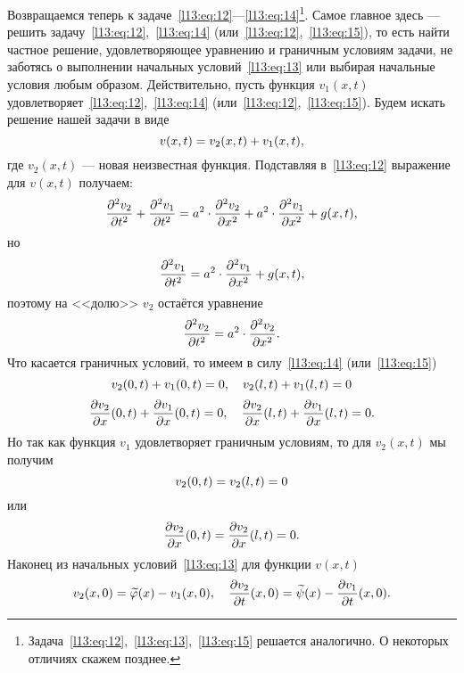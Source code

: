 Возвращаемся теперь к задаче~\eqref{l13:eq:12}---\eqref{l13:eq:14}\footnote{Задача~\eqref{l13:eq:12},~\eqref{l13:eq:13},~\eqref{l13:eq:15} решается аналогично. О некоторых отличиях скажем позднее.}. Самое главное здесь --- решить задачу~\eqref{l13:eq:12},~\eqref{l13:eq:14} (или~\eqref{l13:eq:12},~\eqref{l13:eq:15}), то есть найти частное решение, удовлетворяющее уравнению и граничным условиям задачи, не заботясь о выполнении начальных условий~\eqref{l13:eq:13} или выбирая начальные условия любым образом. Действительно, пусть функция $v_1(x,t)$ удовлетворяет~\eqref{l13:eq:12},~\eqref{l13:eq:14} (или~\eqref{l13:eq:12},~\eqref{l13:eq:15}). Будем искать решение нашей задачи в виде
\begin{equation*}
	\hfill v(x,t)=v_{2}(x,t)+v_1(x,t),\hfill
\end{equation*}
где $v_2(x,t)$ --- новая неизвестная функция. Подставляя в~\eqref{l13:eq:12} выражение для $v(x,t)$ получаем:
\begin{equation*}
	\hfill\pdder{v_2}{t}+\pdder{v_1}{t}=a^2\cdot\pdder{v_2}{x}+a^2\cdot\pdder{v_1}{x}+g(x,t),\hfill
\end{equation*}
но
\begin{equation*}
	\hfill\pdder{v_1}{t}=a^2\cdot\pdder{v_1}{x}+g(x,t),\hfill
\end{equation*}
поэтому на <<долю>> $v_2$ остаётся уравнение
\begin{equation}\label{l13:eq:16}
	\hfill\pdder{v_2}{t}=a^2\cdot\pdder{v_2}{x}.\hfill
\end{equation}
Что касается граничных условий, то имеем в силу~\eqref{l13:eq:14} (или~\eqref{l13:eq:15})
\begin{equation*}
	\hfill v_2(0,t)+v_1(0,t)=0,\quad v_2(l,t)+v_1(l,t)=0\hfill
\end{equation*} 
\begin{equation*}
	\hfill \pder{v_2}{x}(0,t)+\pder{v_1}{x}(0,t)=0,\quad \pder{v_2}{x}(l,t)+\pder{v_1}{x}(l,t)=0.\hfill
\end{equation*} 
Но так как функция $v_1$ удовлетворяет граничным условиям, то для $v_2(x,t)$ мы получим 
\begin{equation}\label{l13:eq:17}
	\hfill v_2(0,t)=v_2(l,t)=0\hfill
\end{equation}
или
\begin{equation}\label{l13:eq:18}
	\hfill \pder{v_2}{x}(0,t)=\pder{v_2}{x}(l,t)=0.\hfill
\end{equation}
Наконец из начальных условий~\eqref{l13:eq:13} для функции $v(x,t)$ 
\begin{equation*}
	\hfill v_2(x,0)=\widetilde{\phi}(x)-v_1(x,0),\quad \pder{v_2}{t}(x,0)=\widetilde{\psi}(x)-\pder{v_1}{t}(x,0).\hfill
\end{equation*}
